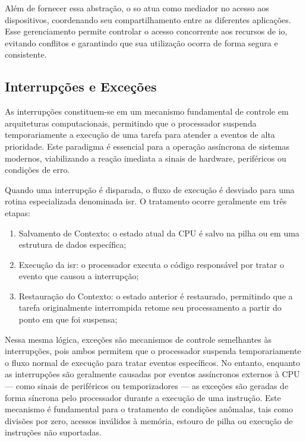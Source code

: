Além de fornecer essa abstração, o \gls{so} atua como mediador no acesso aos dispositivos, coordenando seu compartilhamento entre as diferentes aplicações. Esse
gerenciamento permite controlar o acesso concorrente aos recursos de \gls{io}, evitando conflitos e garantindo que sua utilização ocorra de forma segura e consistente.

\subsection{Interrupções e Exceções}

As interrupções constituem-se em um mecanismo fundamental de controle em arquiteturas computacionais, permitindo que o processador suspenda temporariamente a execução
de uma tarefa para atender a eventos de alta prioridade. Este paradigma é essencial para a operação assíncrona de sistemas modernos, viabilizando a reação imediata
a sinais de hardware, periféricos ou condições de erro.

Quando uma interrupção é disparada, o fluxo de execução é desviado para uma rotina especializada denominada \gls{isr}.
O tratamento ocorre geralmente em três etapas:

\begin{enumerate}
    \item Salvamento de Contexto: o estado atual da CPU é salvo na pilha ou em uma estrutura de dados específica;
    \item Execução da \gls{isr}: o processador executa o código responsável por tratar o evento que causou a interrupção;
    \item Restauração do Contexto: o estado anterior é restaurado, permitindo que a tarefa originalmente interrompida retome seu processamento a partir do ponto em que foi suspensa;
\end{enumerate}

Nessa mesma lógica, exceções são mecanismos de controle semelhantes às interrupções, pois ambos permitem que o processador suspenda temporariamente o fluxo normal de execução para tratar eventos
específicos. No entanto, enquanto as interrupções são geralmente causadas por eventos assíncronos externos à CPU — como sinais de periféricos ou temporizadores —
as exceções são geradas de forma síncrona pelo processador durante a execução de uma instrução.
Este mecanismo é fundamental para o tratamento de condições anômalas, tais como divisões por zero, acessos inválidos à memória, estouro de pilha ou execução de instruções não suportadas.

